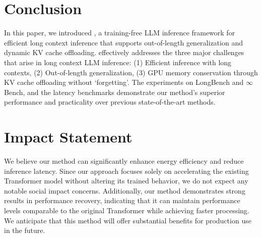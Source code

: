 \section{Conclusion}
\label{conclusion}
In this paper, we introduced \textit{\ours}, a training-free LLM inference framework for efficient long context inference that supports out-of-length generalization and dynamic KV cache offloading.
\ours effectively addresses the three major challenges that arise in long context LLM inference:
(1) Efficient inference with long contexts,
(2) Out-of-length generalization,
(3) GPU memory conservation through KV cache offloading without `forgetting'.
The experiments on LongBench and $\infty$Bench, and the latency benchmarks demonstrate our method's superior performance and practicality over previous state-of-the-art methods.

\section*{Impact Statement}

We believe our method can significantly enhance energy efficiency and reduce inference latency. Since our approach focuses solely on accelerating the existing Transformer model without altering its trained behavior, we do not expect any notable social impact concerns. Additionally, our method demonstrates strong results in performance recovery, indicating that it can maintain performance levels comparable to the original Transformer while achieving faster processing. We anticipate that this method will offer substantial benefits for production use in the future.